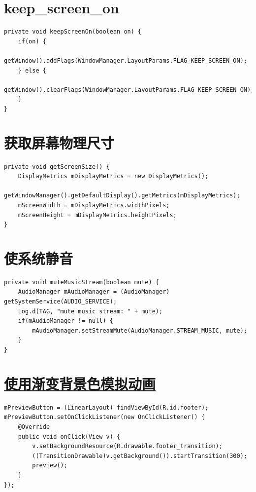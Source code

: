 ﻿\documentclass[a4paper,11pt]{article}
\begin{document}
  \section[keep\_screen\_on]{keep\_screen\_on}
  \begin{verbatim}
private void keepScreenOn(boolean on) {
    if(on) {
        getWindow().addFlags(WindowManager.LayoutParams.FLAG_KEEP_SCREEN_ON);
    } else {
        getWindow().clearFlags(WindowManager.LayoutParams.FLAG_KEEP_SCREEN_ON);
    }
}
  \end{verbatim}

  \section[获取屏幕物理尺寸]{获取屏幕物理尺寸}
  \begin{verbatim}
private void getScreenSize() {
    DisplayMetrics mDisplayMetrics = new DisplayMetrics();
    getWindowManager().getDefaultDisplay().getMetrics(mDisplayMetrics);
    mScreenWidth = mDisplayMetrics.widthPixels;
    mScreenHeight = mDisplayMetrics.heightPixels;
}
  \end{verbatim}

  \section[使系统静音]{使系统静音}
  \begin{verbatim}
private void muteMusicStream(boolean mute) {
    AudioManager mAudioManager = (AudioManager) getSystemService(AUDIO_SERVICE);
    Log.d(TAG, "mute music stream: " + mute);
    if(mAudioManager != null) {
        mAudioManager.setStreamMute(AudioManager.STREAM_MUSIC, mute);
    }
}
  \end{verbatim}

  \section[使用渐变背景色模拟动画]{\underline{使用渐变背景色模拟动画}}
  \begin{verbatim}
mPreviewButton = (LinearLayout) findViewById(R.id.footer);
mPreviewButton.setOnClickListener(new OnClickListener() {
    @Override
    public void onClick(View v) {
        v.setBackgroundResource(R.drawable.footer_transition);
        ((TransitionDrawable)v.getBackground()).startTransition(300);
        preview();
    }
});
  \end{verbatim}
\end{document}
